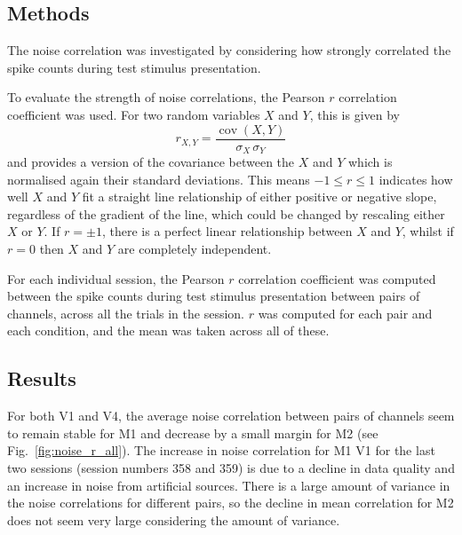 \subsection{Methods}
\label{sec:dec-meth-noise}

The noise correlation was investigated by considering how strongly correlated the spike counts during test stimulus presentation.

To evaluate the strength of noise correlations, the Pearson $r$ correlation coefficient was used.
For two random variables $X$ and $Y$, this is given by
$$r_{X,Y} = \frac{\operatorname{cov}(X,Y)}{\sigma_X \, \sigma_Y}$$
and provides a version of the covariance between the $X$ and $Y$ which is normalised again their standard deviations.
This means $-1 \le r \le 1$ indicates how well $X$ and $Y$ fit a straight line relationship of either positive or negative slope, regardless of the gradient of the line, which could be changed by rescaling either $X$ or $Y$.
If $r=\pm1$, there is a perfect linear relationship between $X$ and $Y$, whilst if $r=0$ then $X$ and $Y$ are completely independent.

For each individual session, the Pearson $r$ correlation coefficient was computed between the spike counts during test stimulus presentation between pairs of channels, across all the trials in the session.
$r$ was computed for each pair and each condition, and the mean was taken across all of these.


\subsection{Results}

For both \ac{V1} and \ac{V4}, the average noise correlation between pairs of channels seem to remain stable for \ac{M1} and decrease by a small margin for \ac{M2} (see Fig.~\ref{fig:noise_r_all}).
The increase in noise correlation for \ac{M1} \ac{V1} for the last two sessions (session numbers 358 and 359) is due to a decline in data quality and an increase in noise from artificial sources.
There is a large amount of variance in the noise correlations for different pairs, so the decline in mean correlation for \ac{M2} does not seem very large considering the amount of variance.



